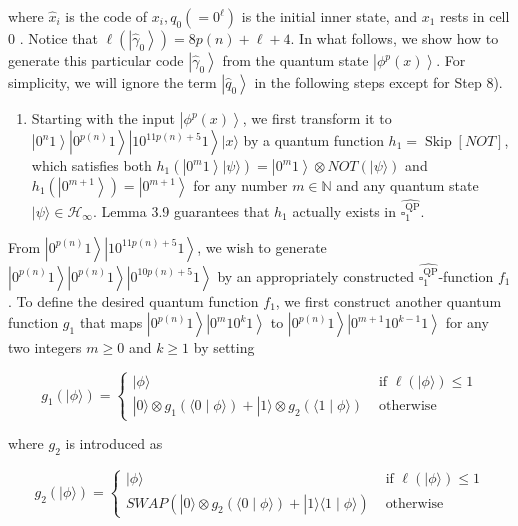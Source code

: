 \documentclass[10pt]{article}
\begin{document}
where $\hat{x}_{i}$ is the code of $x_{i}, q_{0}\left(=0^{\ell}\right)$ is the initial inner state, and $x_{1}$ rests in cell 0 . Notice that $\ell\left(\left|\hat{\gamma}_{0}\right\rangle\right)= 8 p(n)+\ell+4$. In what follows, we show how to generate this particular code $\left|\hat{\gamma}_{0}\right\rangle$ from the quantum state $\left|\phi^{p}(x)\right\rangle$. For simplicity, we will ignore the term $\left|\hat{q}_{0}\right\rangle$ in the following steps except for Step 8).

\begin{enumerate}
  \item Starting with the input $\left|\phi^{p}(x)\right\rangle$, we first transform it to $\left|0^{n} 1\right\rangle\left|0^{p(n)} 1\right\rangle\left|10^{11 p(n)+5} 1\right\rangle|x\rangle$ by a quantum function $h_{1}=\operatorname{Skip}[N O T]$, which satisfies both $h_{1}\left(\left|0^{m} 1\right\rangle|\psi\rangle\right)=\left|0^{m} 1\right\rangle \otimes N O T(|\psi\rangle)$ and $h_{1}\left(\left|0^{m+1}\right\rangle\right)=\left|0^{m+1}\right\rangle$ for any number $m \in \mathbb{N}$ and any quantum state $|\psi\rangle \in \mathcal{H}_{\infty}$. Lemma 3.9 guarantees that $h_{1}$ actually exists in $\widehat{\square_{1}^{\mathrm{QP}}}$.
\end{enumerate}

From $\left|0^{p(n)} 1\right\rangle\left|10^{11 p(n)+5} 1\right\rangle$, we wish to generate $\left|0^{p(n)} 1\right\rangle\left|0^{p(n)} 1\right\rangle\left|0^{10 p(n)+5} 1\right\rangle$ by an appropriately constructed $\widehat{\square_{1}^{\mathrm{QP}}}$-function $f_{1}$. To define the desired quantum function $f_{1}$, we first construct another quantum function $g_{1}$ that maps $\left|0^{p(n)} 1\right\rangle\left|0^{m} 10^{k} 1\right\rangle$ to $\left|0^{p(n)} 1\right\rangle\left|0^{m+1} 10^{k-1} 1\right\rangle$ for any two integers $m \geq 0$ and $k \geq 1$ by setting

$$
g_{1}(|\phi\rangle)= \begin{cases}|\phi\rangle & \text { if } \ell(|\phi\rangle) \leq 1 \\ |0\rangle \otimes g_{1}(\langle 0 \mid \phi\rangle)+|1\rangle \otimes g_{2}(\langle 1 \mid \phi\rangle) & \text { otherwise }\end{cases}
$$

where $g_{2}$ is introduced as

$$
g_{2}(|\phi\rangle)= \begin{cases}|\phi\rangle & \text { if } \ell(|\phi\rangle) \leq 1 \\ S W A P\left(|0\rangle \otimes g_{2}(\langle 0 \mid \phi\rangle)+|1\rangle\langle 1 \mid \phi\rangle\right) & \text { otherwise }\end{cases}
$$
\end{document}
